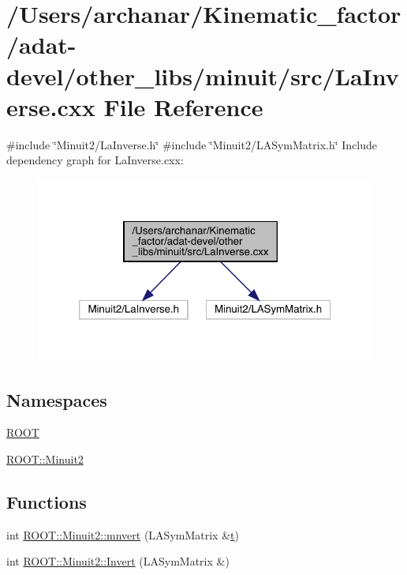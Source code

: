 \hypertarget{adat-devel_2other__libs_2minuit_2src_2LaInverse_8cxx}{}\section{/\+Users/archanar/\+Kinematic\+\_\+factor/adat-\/devel/other\+\_\+libs/minuit/src/\+La\+Inverse.cxx File Reference}
\label{adat-devel_2other__libs_2minuit_2src_2LaInverse_8cxx}
{\ttfamily \#include \char`\"{}Minuit2/\+La\+Inverse.\+h\char`\"{}}\newline
{\ttfamily \#include \char`\"{}Minuit2/\+L\+A\+Sym\+Matrix.\+h\char`\"{}}\newline
Include dependency graph for La\+Inverse.\+cxx\+:
\nopagebreak
\begin{figure}[H]
\begin{center}
\leavevmode
\includegraphics[width=320pt]{dc/d17/adat-devel_2other__libs_2minuit_2src_2LaInverse_8cxx__incl}
\end{center}
\end{figure}
\subsection*{Namespaces}
\begin{DoxyCompactItemize}
\item 
 \mbox{\hyperlink{namespaceROOT}{R\+O\+OT}}
\item 
 \mbox{\hyperlink{namespaceROOT_1_1Minuit2}{R\+O\+O\+T\+::\+Minuit2}}
\end{DoxyCompactItemize}
\subsection*{Functions}
\begin{DoxyCompactItemize}
\item 
int \mbox{\hyperlink{namespaceROOT_1_1Minuit2_a5e64c8eae56aaee62f3b683068e1148a}{R\+O\+O\+T\+::\+Minuit2\+::mnvert}} (L\+A\+Sym\+Matrix \&\mbox{\hyperlink{adat__devel_2lib_2hadron_2hadron__timeslice_8cc_ac310d9181e916ba43604099aee272c71}{t}})
\item 
int \mbox{\hyperlink{namespaceROOT_1_1Minuit2_a3d7791001fe4298059c858771fba35db}{R\+O\+O\+T\+::\+Minuit2\+::\+Invert}} (L\+A\+Sym\+Matrix \&)
\end{DoxyCompactItemize}
